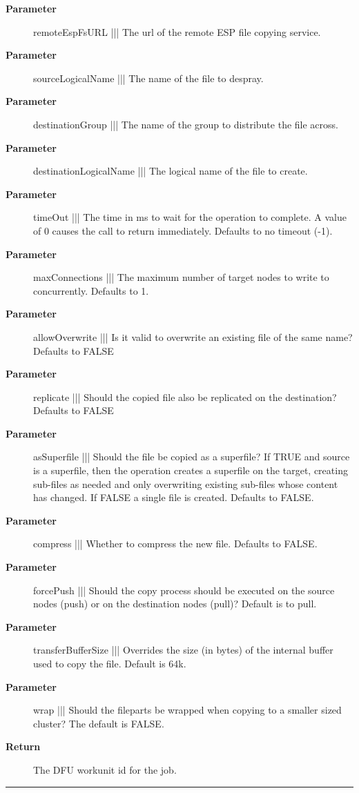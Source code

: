 \par
\begin{description}
\item [\textbf{Parameter}] remoteEspFsURL ||| The url of the remote ESP file copying service.
\item [\textbf{Parameter}] sourceLogicalName ||| The name of the file to despray.
\item [\textbf{Parameter}] destinationGroup ||| The name of the group to distribute the file across.
\item [\textbf{Parameter}] destinationLogicalName ||| The logical name of the file to create.
\item [\textbf{Parameter}] timeOut ||| The time in ms to wait for the operation to complete. A value of 0 causes the call to return immediately. Defaults to no timeout (-1).
\item [\textbf{Parameter}] maxConnections ||| The maximum number of target nodes to write to concurrently. Defaults to 1.
\item [\textbf{Parameter}] allowOverwrite ||| Is it valid to overwrite an existing file of the same name? Defaults to FALSE
\item [\textbf{Parameter}] replicate ||| Should the copied file also be replicated on the destination? Defaults to FALSE
\item [\textbf{Parameter}] asSuperfile ||| Should the file be copied as a superfile? If TRUE and source is a superfile, then the operation creates a superfile on the target, creating sub-files as needed and only overwriting existing sub-files whose content has changed. If FALSE a single file is created. Defaults to FALSE.
\item [\textbf{Parameter}] compress ||| Whether to compress the new file. Defaults to FALSE.
\item [\textbf{Parameter}] forcePush ||| Should the copy process should be executed on the source nodes (push) or on the destination nodes (pull)? Default is to pull.
\item [\textbf{Parameter}] transferBufferSize ||| Overrides the size (in bytes) of the internal buffer used to copy the file. Default is 64k.
\item [\textbf{Parameter}] wrap ||| Should the fileparts be wrapped when copying to a smaller sized cluster? The default is FALSE.
\item [\textbf{Return}] The DFU workunit id for the job.
\end{description}

\rule{\linewidth}{0.5pt}
